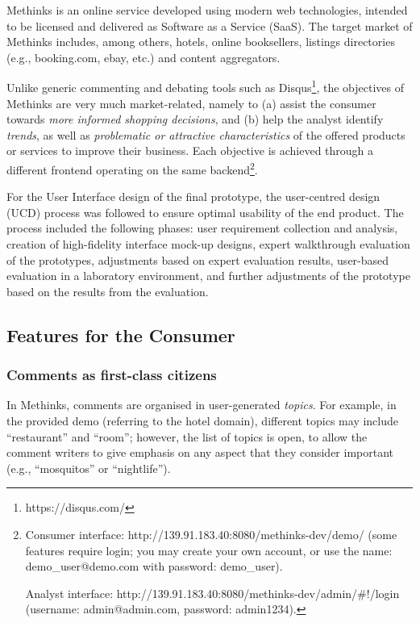 \documentclass[runningheads,a4paper]{llncs}
\begin{document}
Methinks is an online service developed using modern web technologies, intended to be licensed and delivered as Software as a Service (SaaS). The target market of Methinks includes, among others, hotels, online booksellers, listings directories (e.g., booking.com, ebay, etc.) and content aggregators.

Unlike generic commenting and debating tools such as Disqus\footnote{ https://disqus.com/}, the objectives of Methinks are very much market-related, namely to (a) assist the consumer towards {\em more informed shopping decisions}, and (b) help the analyst identify {\em trends}, as well as {\em problematic or attractive characteristics} of the offered products or services to improve their business. Each objective is achieved through a different frontend operating on the same backend\footnote{ Consumer interface: http://139.91.183.40:8080/methinks-dev/demo/ (some features require login; you may create your own account, or use the name: demo\_user@demo.com with password: demo\_user).

Analyst interface: http://139.91.183.40:8080/methinks-dev/admin/\#!/login (username: admin@admin.com, password: admin1234).}.

For the User Interface design of the final prototype, the user-centred design (UCD) process  \cite{_Ref490738642} was followed to ensure optimal usability of the end product. The process included the following phases: user requirement collection and analysis, creation of high-fidelity interface mock-up designs, expert walkthrough evaluation of the prototypes, adjustments based on expert evaluation results, user-based evaluation in a laboratory environment, and further adjustments of the prototype based on the results from the evaluation.

\subsection{Features for the Consumer}

\subsubsection{Comments as first-class citizens}

In Methinks, comments are organised in user-generated {\em topics}. For example, in the provided demo (referring to the hotel domain), different topics may include ``restaurant'' and ``room''; however, the list of topics is open, to allow the comment writers to give emphasis on any aspect that they consider important (e.g., ``mosquitos'' or ``nightlife'').
\end{document}

